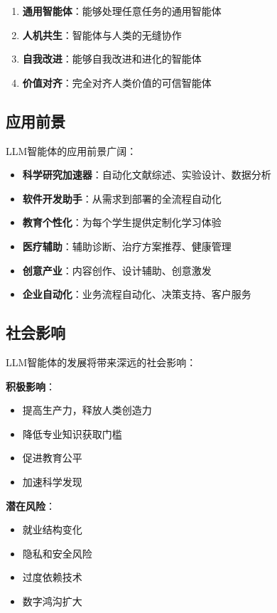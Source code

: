\begin{enumerate}[leftmargin=2em]
    \item \textbf{通用智能体}：能够处理任意任务的通用智能体
    \item \textbf{人机共生}：智能体与人类的无缝协作
    \item \textbf{自我改进}：能够自我改进和进化的智能体
    \item \textbf{价值对齐}：完全对齐人类价值的可信智能体
\end{enumerate}

\subsection{应用前景}

LLM智能体的应用前景广阔：

\begin{itemize}[leftmargin=2em]
    \item \textbf{科学研究加速器}：自动化文献综述、实验设计、数据分析
    \item \textbf{软件开发助手}：从需求到部署的全流程自动化
    \item \textbf{教育个性化}：为每个学生提供定制化学习体验
    \item \textbf{医疗辅助}：辅助诊断、治疗方案推荐、健康管理
    \item \textbf{创意产业}：内容创作、设计辅助、创意激发
    \item \textbf{企业自动化}：业务流程自动化、决策支持、客户服务
\end{itemize}

\subsection{社会影响}

LLM智能体的发展将带来深远的社会影响：

\textbf{积极影响}：
\begin{itemize}[leftmargin=2em]
    \item 提高生产力，释放人类创造力
    \item 降低专业知识获取门槛
    \item 促进教育公平
    \item 加速科学发现
\end{itemize}

\textbf{潜在风险}：
\begin{itemize}[leftmargin=2em]
    \item 就业结构变化
    \item 隐私和安全风险
    \item 过度依赖技术
    \item 数字鸿沟扩大
\end{itemize}

